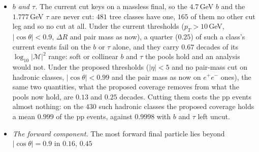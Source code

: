 \documentclass[11pt]{article}
\begin{document}
\begin{itemize}
    decades, on $2\to3$ and $2\to4$ mostly at the bottom ($1.74$ and $3.24$ on the minimum): the mass dimension of a
    $2\to n$ amplitude squared falls by two per extra final particle, so a higher $\sqrt{\hat s}$ lowers it; on $2\to2$
    it is the top that grows ($1.60$).
  \item \emph{$b$ and $\tau$.} The current cut keys on a massless final, so the $4.7$\,GeV $b$ and the $1.777$\,GeV $\tau$
    are never cut: $481$ tree classes have one, $165$ of them no other cut leg and so no cut at all. Under the current
    thresholds ($p_T>10$\,GeV, $|\cos\theta|<0.9$, $\Delta R$ and pair mass as now), a quarter ($0.25$) of such a class's
    current events fail on the $b$ or $\tau$ alone, and they carry $0.67$ decades of its $\log_{10}|\mathcal M|^2$
    range: soft or collinear $b$ and $\tau$ the pools hold and an analysis would not. Under the proposed thresholds
    ($|\eta|<5$ and no pair-mass cut on hadronic classes, $|\cos\theta|<0.99$ and the pair mass as now on $e^+e^-$
    ones), the same two quantities, what the proposed coverage removes from what the pools now hold, are $0.13$ and
    $0.25$ decades. Cutting them costs the pp events almost nothing: on the $430$ such hadronic classes the
    proposed coverage holds a mean $0.999$ of the pp events, against $0.9998$ with $b$ and $\tau$ left uncut.
  \item \emph{The forward component.} The most forward final particle lies beyond $|\cos\theta|=0.9$ in $0.16$, $0.45$

\end{itemize}
\end{document}
